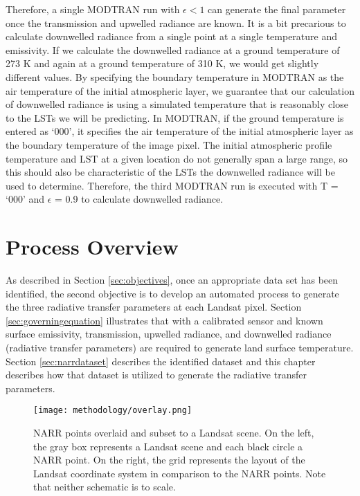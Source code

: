 \documentclass{book}
\begin{document}
Therefore, a single MODTRAN run with $\epsilon < 1$ can generate the final parameter once the transmission and upwelled radiance are known.  It is a bit precarious to calculate downwelled radiance from a single point at a single temperature and emissivity.  If we calculate the downwelled radiance at a ground temperature of 273 K and again at a ground temperature of 310 K, we would get slightly different values.  By specifying the boundary temperature in MODTRAN as the air temperature of the initial atmospheric layer, we guarantee that our calculation of downwelled radiance is using a simulated temperature that is reasonably close to the LSTs we will be predicting.  In MODTRAN, if the ground temperature is entered as `000', it specifies the air temperature of the initial atmospheric layer as the boundary temperature of the image pixel.  The initial atmospheric profile temperature and LST at a given location do not generally span a large range, so this should also be characteristic of the LSTs the downwelled radiance will be used to determine.  Therefore, the third MODTRAN run is executed with T = `000' and $\epsilon$ = 0.9 to calculate downwelled radiance.

\section{Process Overview}
\label{sec:overview}

As described in Section \ref{sec:objectives}, once an appropriate data set has been identified, the second objective is to develop an automated process to generate the three radiative transfer parameters at each Landsat pixel.  Section \ref{sec:governingequation} illustrates that with a calibrated sensor and known surface emissivity, transmission, upwelled radiance, and downwelled radiance (radiative transfer parameters) are required to generate land surface temperature.  Section \ref{sec:narrdataset} describes the identified dataset and this chapter describes how that dataset is utilized to generate the radiative transfer parameters.

\begin{figure}[H]
\centering
\texttt{[image: methodology/overlay.png]}
\caption{NARR points overlaid and subset to a Landsat scene.  On the left, the gray box represents a Landsat scene and each black circle a NARR point.  On the right, the grid represents the layout of the Landsat coordinate system in comparison to the NARR points.  Note that neither schematic is to scale.}
\label{fig:overlay}
\end{figure}
\end{document}
